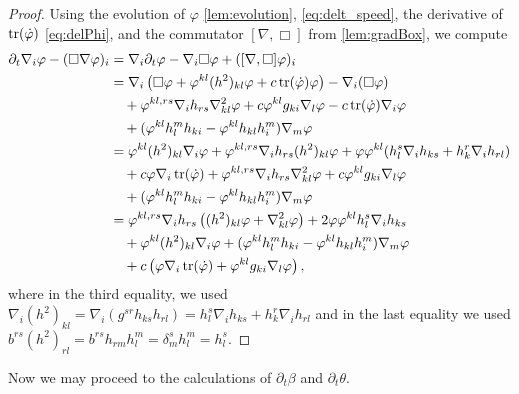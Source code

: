 \documentclass{amsart}
\begin{document}
\begin{proof}
Using the evolution of \(\varphi\) \cref{lem:evolution}, \cref{eq:delt_speed}, the derivative of \(\operatorname{tr}(\dot{\varphi})\) \cref{eq:delPhi}, and the commutator \([\nabla, \Box]\) from \cref{lem:gradBox}, we compute
\[
\begin{split}
\partial_{t}\nabla_i \varphi - (\Box\nabla \varphi)_{i} &= \nabla_i \partial_t \varphi - \nabla_i \Box \varphi + ([\nabla, \Box] \varphi)_i \\
&= \nabla_i \left(\Box\varphi + \varphi^{kl}(h^2)_{kl}\varphi + c \operatorname{tr}(\dot{\varphi})\varphi\right) - \nabla_i (\Box\varphi) \\
&\quad + \varphi^{kl,rs} \nabla_i h_{rs} \nabla^2_{kl} \varphi + c\varphi^{kl}g_{ki} \nabla_l \varphi - c\operatorname{tr}(\dot{\varphi})\nabla_i \varphi \\
&\quad + (\varphi^{kl}h^{m}_{l}h_{ki} - \varphi^{kl}h_{kl}h^{m}_{i}) \nabla_m \varphi \\
&= \varphi^{kl}(h^2)_{kl}\nabla_i \varphi + \varphi^{kl,rs}\nabla_i h_{rs} (h^2)_{kl}\varphi + \varphi\varphi^{kl}(h^s_l \nabla_i h_{ks} + h^r_k \nabla_i h_{rl})\\&\quad  + c \varphi\nabla_i\operatorname{tr}(\dot{\varphi})
+ \varphi^{kl,rs} \nabla_i h_{rs} \nabla^2_{kl} \varphi + c\varphi^{kl}g_{ki}\nabla_l \varphi \\
&\quad + (\varphi^{kl}h^{m}_{l}h_{ki} - \varphi^{kl}h_{kl}h^{m}_{i}) \nabla_m \varphi \\
&= \varphi^{kl,rs}\nabla_i h_{rs} \left((h^2)_{kl}\varphi + \nabla^2_{kl} \varphi\right) + 2 \varphi\varphi^{kl} h^s_l \nabla_i h_{ks} \\
&\quad + \varphi^{kl}(h^2)_{kl}\nabla_i \varphi + (\varphi^{kl}h^{m}_{l}h_{ki} - \varphi^{kl}h_{kl}h^{m}_{i}) \nabla_m \varphi \\
&\quad + c \left(\varphi\nabla_i\operatorname{tr}(\dot{\varphi}) + \varphi^{kl}g_{ki}\nabla_l \varphi\right),
\end{split}
\]
where in the third equality, we used
$
\nabla_i (h^2)_{kl} = \nabla_i (g^{sr} h_{ks} h_{rl}) = h^s_l \nabla_i h_{ks} + h^r_k \nabla_i h_{rl}
$
and in the last equality we used
$
b^{rs} (h^2)_{rl} = b^{rs} h_{rm} h^m_l = \delta^s_m h^m_l = h^s_l.
$
\end{proof}
Now we may proceed to the calculations of \(\partial_t \beta\) and \(\partial_t \theta\).
\end{document}
